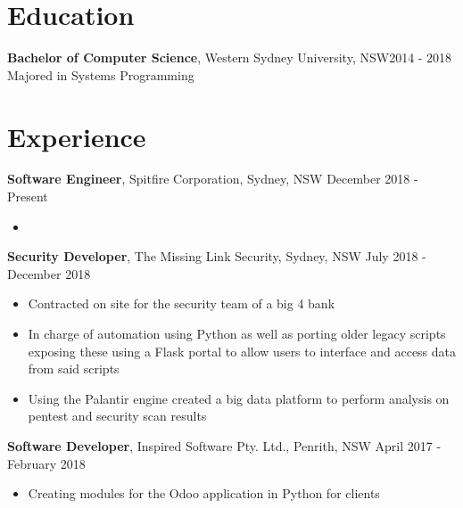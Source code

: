 \documentclass[margin]{res}
\begin{document}

\address{{\bf Present Address} \\ 26/23-25 John Street\\ Lidcombe, NSW 2141  \\
        +61414329597 }
\address{{\bf Email Address} \\ ben.hili1994@gmail.com }


\begin{resume}

\section{Education}
	{\bf Bachelor of Computer Science}, Western Sydney University, NSW\hfill 2014 - 2018\\ 
	Majored in Systems Programming

\section{Experience}
{\bf Software Engineer}, 
	Spitfire Corporation, Sydney, NSW \hfill December 2018 - Present
\begin{itemize} \itemsep 0pt  %
\item  
\end{itemize}

{\bf Security Developer}, 
	The Missing Link Security, Sydney, NSW \hfill July 2018 - December 2018
\begin{itemize} \itemsep 0pt  %
\item Contracted on site for the security team of a big 4 bank
\item In charge of automation using Python as well as porting older legacy scripts 
	exposing these using a Flask portal to allow users to interface and access data
		from said scripts
\item Using the Palantir engine created a big data platform to perform analysis on
	pentest and security scan results
\end{itemize}

{\bf Software Developer}, 
	Inspired Software Pty. Ltd., Penrith, NSW \hfill April 2017 - February 2018
\begin{itemize} \itemsep 0pt  %
\item Creating modules for the Odoo application in Python for clients


\end{itemize}
\end{resume}
\end{document}
